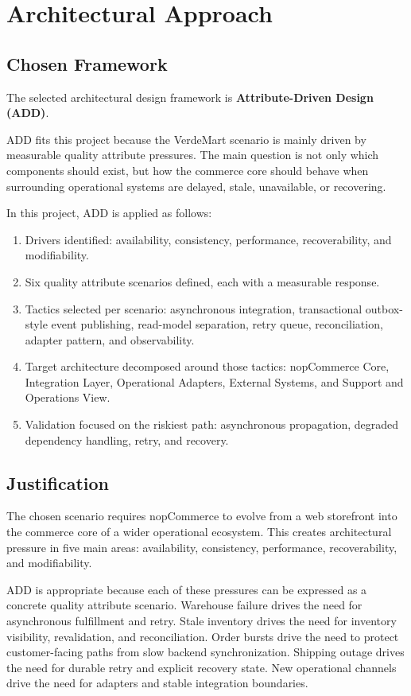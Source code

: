 \chapter{Architectural Approach}

\section{Chosen Framework}

The selected architectural design framework is \textbf{Attribute-Driven Design (ADD)}.

ADD fits this project because the VerdeMart scenario is mainly driven by measurable quality
attribute pressures. The main question is not only which components should exist, but how the
commerce core should behave when surrounding operational systems are delayed, stale,
unavailable, or recovering.

In this project, ADD is applied as follows:

\begin{enumerate}
    \item Drivers identified: availability, consistency, performance, recoverability, and modifiability.
    \item Six quality attribute scenarios defined, each with a measurable response.
    \item Tactics selected per scenario: asynchronous integration, transactional outbox-style event publishing, read-model separation, retry queue, reconciliation, adapter pattern, and observability.
    \item Target architecture decomposed around those tactics: nopCommerce Core, Integration Layer, Operational Adapters, External Systems, and Support and Operations View.
    \item Validation focused on the riskiest path: asynchronous propagation, degraded dependency handling, retry, and recovery.
\end{enumerate}

\section{Justification}

The chosen scenario requires nopCommerce to evolve from a web storefront into the commerce
core of a wider operational ecosystem. This creates architectural pressure in five main areas:
availability, consistency, performance, recoverability, and modifiability.

ADD is appropriate because each of these pressures can be expressed as a concrete quality
attribute scenario. Warehouse failure drives the need for asynchronous fulfillment and retry.
Stale inventory drives the need for inventory visibility, revalidation, and reconciliation. Order
bursts drive the need to protect customer-facing paths from slow backend synchronization.
Shipping outage drives the need for durable retry and explicit recovery state. New operational
channels drive the need for adapters and stable integration boundaries.

